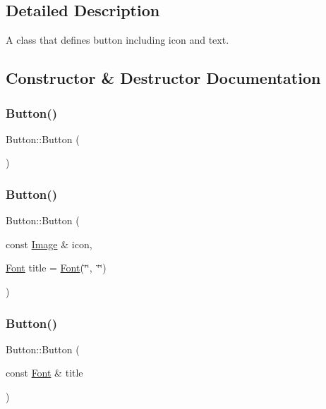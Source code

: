 \subsection{Detailed Description}
A class that defines button including icon and text. 

\subsection{Constructor \& Destructor Documentation}
\mbox{\label{class_button_a3b36df1ae23c58aedb9e15a713159459}} 
\subsubsection{\texorpdfstring{Button()}{Button()}\hspace{0.1cm}{\footnotesize\ttfamily [1/3]}}
{\footnotesize\ttfamily Button\+::\+Button (\begin{DoxyParamCaption}{ }\end{DoxyParamCaption})}

\mbox{\label{class_button_a0afd720661614d65ec8f59a20ba2e1d0}} 
\subsubsection{\texorpdfstring{Button()}{Button()}\hspace{0.1cm}{\footnotesize\ttfamily [2/3]}}
{\footnotesize\ttfamily Button\+::\+Button (\begin{DoxyParamCaption}\item[{const \mbox{\hyperlink{class_image}{Image}} \&}]{icon,  }\item[{\mbox{\hyperlink{class_font}{Font}}}]{title = {\ttfamily \mbox{\hyperlink{class_font}{Font}}(\char`\"{}\char`\"{},~\char`\"{}\char`\"{})} }\end{DoxyParamCaption})}

\mbox{\label{class_button_aeec07db7dcdbf546a152b2056c167a4a}} 
\subsubsection{\texorpdfstring{Button()}{Button()}\hspace{0.1cm}{\footnotesize\ttfamily [3/3]}}
{\footnotesize\ttfamily Button\+::\+Button (\begin{DoxyParamCaption}\item[{const \mbox{\hyperlink{class_font}{Font}} \&}]{title }\end{DoxyParamCaption})}

